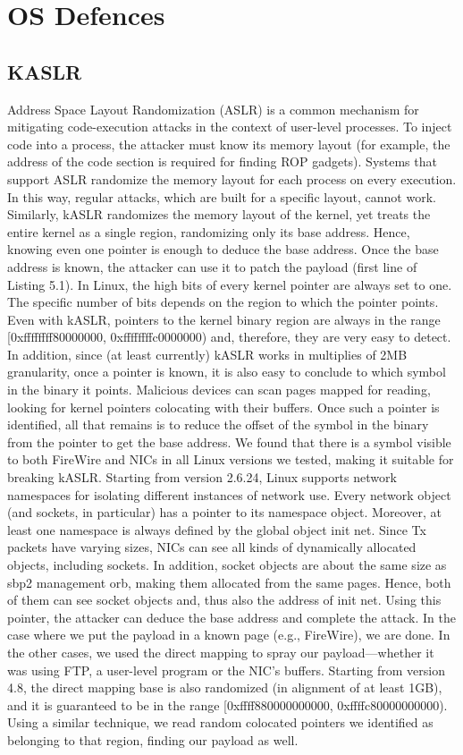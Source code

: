 \section{OS Defences}
\subsection{KASLR}
Address Space Layout Randomization (ASLR) is a common mechanism for mitigating
code-execution attacks in the context of user-level processes. To inject code into a
process, the attacker must know its memory layout (for example, the address of the code
section is required for finding ROP gadgets). Systems that support ASLR randomize the
memory layout for each process on every execution. In this way, regular attacks, which
are built for a specific layout, cannot work. Similarly, kASLR randomizes the memory
layout of the kernel, yet treats the entire kernel as a single region, randomizing only its
base address. Hence, knowing even one pointer is enough to deduce the base address.
Once the base address is known, the attacker can use it to patch the payload (first line of Listing 5.1).
In Linux, the high bits of every kernel pointer are always set to one. The specific number of bits depends on the region to which the pointer points. Even with
kASLR, pointers to the kernel binary region are always in the range [0xffffffff80000000,
0xffffffffc0000000) and, therefore, they are very easy to detect. In addition, since (at
least currently) kASLR works in multiplies of 2MB granularity, once a pointer is known,
it is also easy to conclude to which symbol in the binary it points. Malicious devices
can scan pages mapped for reading, looking for kernel pointers colocating with their
buffers. Once such a pointer is identified, all that remains is to reduce the offset of the
symbol in the binary from the pointer to get the base address.
We found that there is a symbol visible to both FireWire and NICs in all Linux
versions we tested, making it suitable for breaking kASLR. Starting from version
2.6.24, Linux supports network namespaces for isolating different instances of network
use. Every network object (and sockets, in particular) has a pointer to its namespace
object. Moreover, at least one namespace is always defined by the global object init net.
Since Tx packets have varying sizes, NICs can see all kinds of dynamically allocated
objects, including sockets. In addition, socket objects are about the same size as
sbp2 management orb, making them allocated from the same pages. Hence, both of
them can see socket objects and, thus also the address of init net. Using this pointer,
the attacker can deduce the base address and complete the attack.
In the case where we put the payload in a known page (e.g., FireWire), we are
done. In the other cases, we used the direct mapping to spray our payload—whether it
was using FTP, a user-level program or the NIC’s buffers. Starting from version 4.8,
the direct mapping base is also randomized (in alignment of at least 1GB), and it is
guaranteed to be in the range [0xffff880000000000, 0xffffc80000000000). Using a similar
technique, we read random colocated pointers we identified as belonging to that region,
finding our payload as well.

